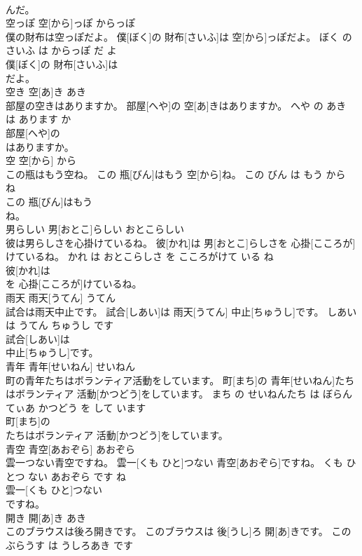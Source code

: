 \documentclass[8pt]{extreport}
\begin{document}
\begin{CJK}{UTF8}{min}
\\	んだ。			
\\	空っぽ	空[から]っぽ	からっぽ	
\\	僕の財布は空っぽだよ。	僕[ぼく]の 財布[さいふ]は 空[から]っぽだよ。	ぼく の さいふ は からっぽ だ よ	
\\	僕[ぼく]の 財布[さいふ]は
\\	だよ。			
\\	空き	空[あ]き	あき	
\\	部屋の空きはありますか。	部屋[へや]の 空[あ]きはありますか。	へや の あき は あります か	
\\	部屋[へや]の
\\	はありますか。			
\\	空	空[から]	から	
\\	この瓶はもう空ね。	この 瓶[びん]はもう 空[から]ね。	この びん は もう から ね	
\\	この 瓶[びん]はもう
\\	ね。			
\\	男らしい	男[おとこ]らしい	おとこらしい	
\\	彼は男らしさを心掛けているね。	彼[かれ]は 男[おとこ]らしさを 心掛[こころが]けているね。	かれ は おとこらしさ を こころがけて いる ね	
\\	彼[かれ]は
\\	を 心掛[こころが]けているね。			
\\	雨天	雨天[うてん]	うてん	
\\	試合は雨天中止です。	試合[しあい]は 雨天[うてん] 中止[ちゅうし]です。	しあい は うてん ちゅうし です	
\\	試合[しあい]は
\\	中止[ちゅうし]です。			
\\	青年	青年[せいねん]	せいねん	
\\	町の青年たちはボランティア活動をしています。	町[まち]の 青年[せいねん]たちはボランティア 活動[かつどう]をしています。	まち の せいねんたち は ぼらんてぃあ かつどう を して います	
\\	町[まち]の
\\	たちはボランティア 活動[かつどう]をしています。			
\\	青空	青空[あおぞら]	あおぞら	
\\	雲一つない青空ですね。	雲一[くも ひと]つない 青空[あおぞら]ですね。	くも ひとつ ない あおぞら です ね	
\\	雲一[くも ひと]つない
\\	ですね。			
\\	開き	開[あ]き	あき	
\\	このブラウスは後ろ開きです。	このブラウスは 後[うし]ろ 開[あ]きです。	この ぶらうす は うしろあき です	

\end{CJK}
\end{document}
